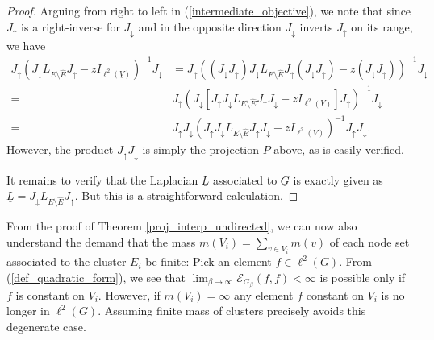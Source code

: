 \documentclass[reqno,12pt,letterpaper]{amsart}
\numberwithin{equation}{section}
\newcommand{\1}{\mathds{1}}
\theoremstyle{definition}
\begin{document}
\begin{proof}
Arguing from right to left in (\ref{intermediate_objective}),  we note that since \( J_\uparrow \) is a right-inverse for \( J_\downarrow \) and in the opposite direction \( J_\downarrow \) inverts \( J_\uparrow \) on its range, we have 
\begin{align}
	J_\uparrow  (J_\downarrow  L_{E \setminus \hat{E}}  J_\uparrow - z    I_{\ell^2(\underline{V})})^{-1} J_\downarrow &=
	J_\uparrow  ((J_\downarrow J_\uparrow) J_\downarrow  L_{E \setminus \hat{E}}  J_\uparrow  (J_\downarrow J_\uparrow)- z    (J_\downarrow J_\uparrow))^{-1} J_\downarrow
	\\
	=& 
	J_\uparrow  (J_\downarrow [J_\uparrow J_\downarrow  L_{E \setminus \hat{E}}  J_\uparrow  J_\downarrow - z  I_{\ell^2(V)}  ]J_\uparrow)^{-1} J_\downarrow
	\\
	=& J_\uparrow J_\downarrow  (J_\uparrow J_\downarrow  L_{E \setminus \hat{E}}  J_\uparrow J_\downarrow - z    I_{\ell^2(V)})^{-1}J_\uparrow J_\downarrow.
\end{align}
However, the product \( J_\uparrow J_\downarrow \) is simply the  projection \( P \) above, as is easily verified. 

\medskip

It remains to verify that the Laplacian $\underline{L}$ associated to $\underline{G}$ is exactly given as $\underline{L} = J_\downarrow L_{E\setminus \hat{E}} J_\uparrow$. But this is a straightforward calculation.
\end{proof}



From the proof of Theorem \ref{proj_interp_undirected}, we can now also understand the demand that the mass $m(V_i) = \sum_{v \in V_i} m(v)$ of each node set associated to the cluster $E_i$ be finite:
Pick an element $f \in \ell^2(G)$. From (\ref{def_quadratic_form}), we see that  $\lim_{\beta \rightarrow \infty}	\mathcal{E}_{G_\beta}(f,f) < \infty$ is possible  only if $f$ is constant on $V_i$. However, if $m(V_i)  = \infty$ any element $f$ constant on $V_i$ is no longer in $\ell^2(G)$. Assuming finite mass of clusters precisely avoids this degenerate case.
\end{document}
